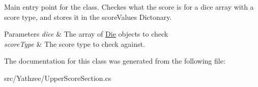 Main entry point for the class. Checkes what the score is for a dice array with a score type, and stores it in the score\+Values Dictonary. 


\begin{DoxyParams}{Parameters}
{\em dice} & The array of \hyperlink{class_yathzee_1_1_die}{Die} objects to check\\
\hline
{\em score\+Type} & The score type to check against.\\
\hline
\end{DoxyParams}


The documentation for this class was generated from the following file\+:\begin{DoxyCompactItemize}
\item 
src/\+Yathzee/Upper\+Score\+Section.\+cs\end{DoxyCompactItemize}
